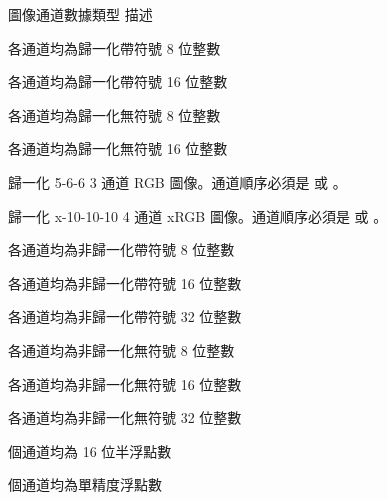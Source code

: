 \bTABLE[option=stretch]

\bTABLEhead
\bTR[background=color,backgroundcolor=gray]
  \bTH 圖像通道數據類型 \eTH
  \bTH 描述 \eTH
\eTR
\eTABLEhead

\bTABLEbody

\bTR
  \bTD {} \eTD
  \bTD 各通道均為歸一化帶符號 8 位整數 \eTD
\eTR

\bTR
  \bTD {} \eTD
  \bTD 各通道均為歸一化帶符號 16 位整數 \eTD
\eTR

\bTR
  \bTD {} \eTD
  \bTD 各通道均為歸一化無符號 8 位整數 \eTD
\eTR

\bTR
  \bTD {} \eTD
  \bTD 各通道均為歸一化無符號 16 位整數 \eTD
\eTR

\bTR
  \bTD {} \eTD
  \bTD 歸一化 5-6-6 3 通道 RGB 圖像。通道順序必須是  或 。 \eTD
\eTR

\bTR
  \bTD {} \eTD
  \bTD 歸一化 x-10-10-10 4 通道 xRGB 圖像。通道順序必須是  或 。 \eTD
\eTR

\bTR
  \bTD {} \eTD
  \bTD 各通道均為非歸一化帶符號 8 位整數 \eTD
\eTR

\bTR
  \bTD {} \eTD
  \bTD 各通道均為非歸一化帶符號 16 位整數 \eTD
\eTR

\bTR
  \bTD {} \eTD
  \bTD 各通道均為非歸一化帶符號 32 位整數 \eTD
\eTR

\bTR
  \bTD {} \eTD
  \bTD 各通道均為非歸一化無符號 8 位整數 \eTD
\eTR

\bTR
  \bTD {} \eTD
  \bTD 各通道均為非歸一化無符號 16 位整數 \eTD
\eTR

\bTR
  \bTD {} \eTD
  \bTD 各通道均為非歸一化無符號 32 位整數 \eTD
\eTR

\bTR
  \bTD {} \eTD
  \bTD 個通道均為 16 位半浮點數 \eTD
\eTR

\bTR
  \bTD {} \eTD
  \bTD 個通道均為單精度浮點數 \eTD
\eTR

\eTABLEbody

\eTABLE

